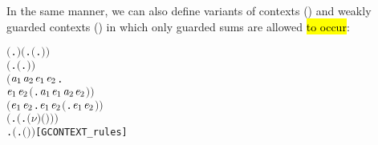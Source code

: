 In the same manner, we can also define variants of contexts () and weakly guarded
contexts () in which only guarded sums are allowed \hl{to occur}:
\begin{alltt}
\HOLTokenTurnstile{}  \ensuremath{(}\HOLTokenLambda{}. \ensuremath{)} \HOLSymConst{\HOLTokenConj{}} \ensuremath{(}\HOLSymConst{\HOLTokenForall{}}.  \ensuremath{(}\HOLTokenLambda{}. \ensuremath{)}\ensuremath{)} \HOLSymConst{\HOLTokenConj{}}
   \ensuremath{(}\HOLSymConst{\HOLTokenForall{}} .   \HOLSymConst{\HOLTokenImp{}}  \ensuremath{(}\HOLTokenLambda{}. \HOLSymConst{\ensuremath{\ldotp}} \ensuremath{)}\ensuremath{)} \HOLSymConst{\HOLTokenConj{}}
   \ensuremath{(}\HOLSymConst{\HOLTokenForall{}}\ensuremath{\HOLBoundVar{a}\sb{\mathrm{1}}} \ensuremath{\HOLBoundVar{a}\sb{\mathrm{2}}} \ensuremath{\HOLBoundVar{e}\sb{\mathrm{1}}} \ensuremath{\HOLBoundVar{e}\sb{\mathrm{2}}}.
         \ensuremath{\HOLBoundVar{e}\sb{\mathrm{1}}} \HOLSymConst{\HOLTokenConj{}}  \ensuremath{\HOLBoundVar{e}\sb{\mathrm{2}}} \HOLSymConst{\HOLTokenImp{}}  \ensuremath{(}\HOLTokenLambda{}. \ensuremath{\HOLBoundVar{a}\sb{\mathrm{1}}}\HOLSymConst{\ensuremath{\ldotp}}\ensuremath{\HOLBoundVar{e}\sb{\mathrm{1}}}  \HOLSymConst{\ensuremath{+}} \ensuremath{\HOLBoundVar{a}\sb{\mathrm{2}}}\HOLSymConst{\ensuremath{\ldotp}}\ensuremath{\HOLBoundVar{e}\sb{\mathrm{2}}} \ensuremath{)}\ensuremath{)} \HOLSymConst{\HOLTokenConj{}}
   \ensuremath{(}\HOLSymConst{\HOLTokenForall{}}\ensuremath{\HOLBoundVar{e}\sb{\mathrm{1}}} \ensuremath{\HOLBoundVar{e}\sb{\mathrm{2}}}.  \ensuremath{\HOLBoundVar{e}\sb{\mathrm{1}}} \HOLSymConst{\HOLTokenConj{}}  \ensuremath{\HOLBoundVar{e}\sb{\mathrm{2}}} \HOLSymConst{\HOLTokenImp{}}  \ensuremath{(}\HOLTokenLambda{}. \ensuremath{\HOLBoundVar{e}\sb{\mathrm{1}}}  \HOLSymConst{\ensuremath{\mid}} \ensuremath{\HOLBoundVar{e}\sb{\mathrm{2}}} \ensuremath{)}\ensuremath{)} \HOLSymConst{\HOLTokenConj{}}
   \ensuremath{(}\HOLSymConst{\HOLTokenForall{}} .   \HOLSymConst{\HOLTokenImp{}}  \ensuremath{(}\HOLTokenLambda{}. \ensuremath{(\nu}\ensuremath{)} \ensuremath{(} \ensuremath{)}\ensuremath{)}\ensuremath{)} \HOLSymConst{\HOLTokenConj{}}
   \HOLSymConst{\HOLTokenForall{}} .   \HOLSymConst{\HOLTokenImp{}}  \ensuremath{(}\HOLTokenLambda{}.  \ensuremath{(} \ensuremath{)} \ensuremath{)}\hfill{[GCONTEXT_rules]}
\end{alltt}
